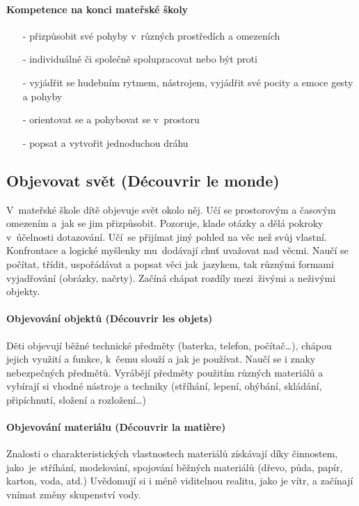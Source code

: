 				\paragraph{Kompetence na konci mateřské školy}

				\begin{itemize}
					\setlength\itemsep{-2mm}
					\item[-] přizpůsobit své pohyby v různých prostředích a omezeních
					\item[-] individuálně či společně spolupracovat nebo být proti
					\item[-] vyjádřit se hudebním rytmem, nástrojem, vyjádřit své pocity a emoce gesty a pohyby
					\item[-] orientovat se a pohybovat se v prostoru
					\item[-] popsat a vytvořit jednoduchou dráhu
				\end{itemize}

		\subsection{Objevovat svět (Découvrir le monde)}
			V mateřské škole dítě objevuje svět okolo něj. Učí se prostorovým a časovým omezením a jak se jim přizpůsobit. Pozoruje, klade otázky a dělá pokroky v účelnosti dotazování. Učí se přijímat jiný pohled na věc než svůj vlastní.  Konfrontace a logické myšlenky mu dodávají chuť uvažovat nad věcmi. Naučí se počítat, třídit, uspořádávat a popsat věci jak jazykem, tak různými formami vyjadřování (obrázky, načrty). Začíná chápat rozdíly mezi živými a neživými objekty.

			\paragraph{Objevování objektů (Découvrir les objets)}
				Děti objevují běžné technické předměty (baterka, telefon, počítač…), chápou jejich využití a funkce, k čemu slouží a jak je používat. Naučí se i znaky nebezpečných předmětů.
				Vyrábějí předměty použitím různých materiálů a vybírají si vhodné nástroje a techniky (stříhání, lepení, ohýbání, skládání, připíchnutí, složení a rozložení…)
			\paragraph{Objevování materiálu (Découvrir la matière)}
				Znalosti o charakteristických vlastnostech materiálů získávají díky činnostem, jako je stříhání, modelování, spojování běžných materiálů (dřevo, půda, papír, karton, voda, atd.)
				Uvědomují si i méně viditelnou realitu, jako je vítr, a začínají vnímat změny skupenství vody. 
